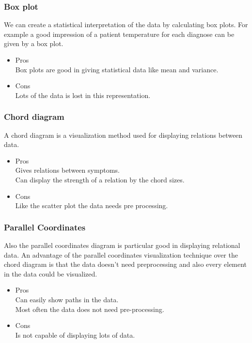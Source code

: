 \documentclass[a4paper,twoside,11pt]{article}
\begin{document}
\newpage

\subsubsection{Box plot}
We can create a statistical interpretation of the data by calculating box plots. For example a good impression of a patient temperature for each diagnose can be given by a box plot.

\begin{itemize}
  \item Pros\\
    Box plots are good in giving statistical data like mean and variance. \\
  \item Cons \\
   Lots of the data is lost in this representation. \\
\end{itemize}

\subsubsection{Chord diagram}
A chord diagram is a visualization method used for displaying relations between data.

\begin{itemize}
  \item Pros\\
    Gives relations between symptoms. \\
    Can display the strength of a relation by the chord sizes.
  \item Cons \\
   Like the scatter plot the data needs pre processing. \\
\end{itemize}

\subsubsection{Parallel Coordinates}
Also the parallel coordinates diagram is particular good in displaying relational data. An advantage of the parallel coordinates visualization technique over the chord diagram is that the data doesn't need preprocessing and also every element in the data could be visualized.

\begin{itemize}
  \item Pros\\
    Can easily show paths in the data. \\
    Most often the data does not need pre-processing. \\
  \item Cons \\
   Is not capable of displaying lots of data. \\
\end{itemize}
\end{document}
